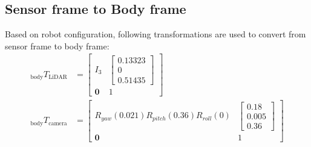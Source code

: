 \documentclass[conference]{IEEEtran}
\begin{document}
\subsection{Sensor frame to Body frame}
Based on robot configuration, following transformations are used to convert 
from sensor frame to body frame:
$$
\begin{aligned}
    {}_{\text{body} }T_{\text{LiDAR} }
        &=\left[ \begin{matrix}I_{3}&\left[ \begin{gathered}0.13323\\ 0\\ 0.51435\end{gathered} \right]  \\ \mathbf{0}&1\end{matrix} \right]  \\ 
    {}_{\text{body} }T_{\text{camera} }
        &=\left[ \begin{matrix}R_{yaw}\left( 0.021\right)  R_{pitch}\left( 0.36\right)  R_{roll}\left( 0\right)  &\left[ \begin{gathered}0.18\\ 0.005\\ 0.36\end{gathered} \right]  \\ \mathbf{0}&1\end{matrix} \right]  
\end{aligned} 
$$
\end{document}
